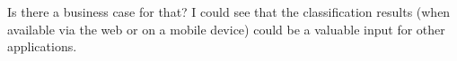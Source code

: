 Is there a business case for that? 
I could see that the classification results (when available via the web or on a mobile device) could be a valuable input for other applications.
